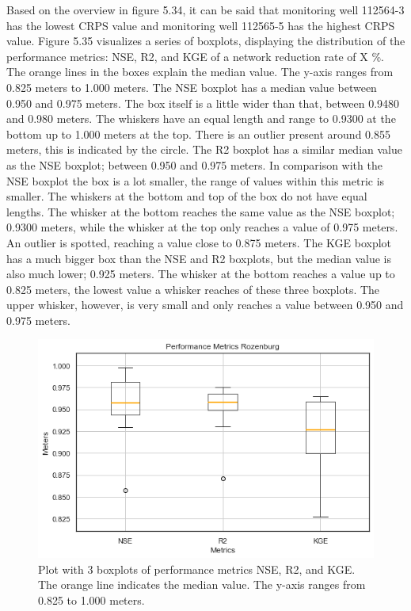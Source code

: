 Based on the overview in figure 5.34, it can be said that monitoring well 112564-3 has the lowest CRPS value and monitoring well 112565-5 has the highest CRPS value. 
\clearpage
Figure 5.35 visualizes a series of boxplots, displaying the distribution of the performance metrics: NSE, R2, and KGE of a network reduction rate of X \%. The orange lines in the boxes explain the median value. The y-axis ranges from 0.825 meters to 1.000 meters. The NSE boxplot has a median value between 0.950 and 0.975 meters. The box itself is a little wider than that, between 0.9480 and 0.980 meters. The whiskers have an equal length and range to 0.9300 at the bottom up to 1.000 meters at the top. There is an outlier present around 0.855 meters, this is indicated by the circle. The R2 boxplot has a similar median value as the NSE boxplot; between 0.950 and 0.975 meters. In comparison with the NSE boxplot the box is a lot smaller, the range of values within this metric is smaller. The whiskers at the bottom and top of the box do not have equal lengths. The whisker at the bottom reaches the same value as the NSE boxplot; 0.9300 meters, while the whisker at the top only reaches a value of 0.975 meters. An outlier is spotted, reaching a value close to 0.875 meters. The KGE boxplot has a much bigger box than the NSE and R2 boxplots, but the median value is also much lower; 0.925 meters. The whisker at the bottom reaches a value up to 0.825 meters, the lowest value a whisker reaches of these three boxplots. The upper whisker, however, is very small and only reaches a value between 0.950 and 0.975 meters. 

\begin{figure}[htbp]
    \centering
    \includegraphics[width=0.80\linewidth]{boxroz.png}
    \caption{Plot with 3 boxplots of performance metrics NSE, R2, and KGE. The orange line indicates the median value. The y-axis ranges from 0.825 to 1.000 meters.}
\end{figure}

